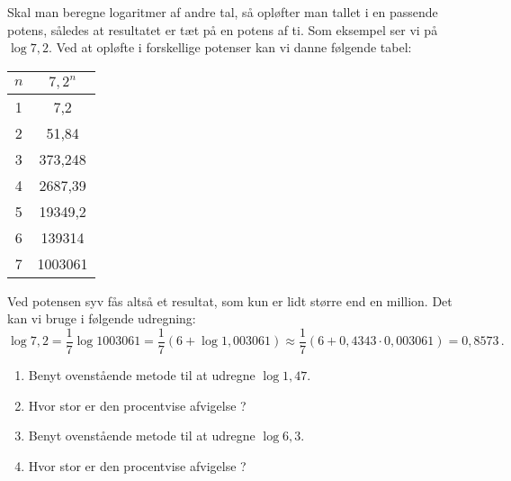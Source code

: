 \documentclass[12pt,oneside,a4paper]{article}
\theoremstyle{plain}
\begin{document}
Skal man beregne logaritmer af andre tal, så opløfter man tallet i en passende
potens, således at resultatet er tæt på en potens af ti. Som eksempel ser vi på
$\log 7,2$. Ved at opløfte i forskellige potenser kan vi danne følgende tabel:

\begin{tabular}{|c|c|}
    \hline
    $n$ & $7,2^n$ \\
    \hline
    1 & 7,2 \\
    \hline
    2 & 51,84 \\
    \hline
    3 & 373,248 \\
    \hline
    4 & 2687,39 \\
    \hline
    5 & 19349,2 \\
    \hline
    6 & 139314 \\
    \hline
    7 & 1003061 \\
    \hline
\end{tabular}

Ved potensen syv fås altså et resultat, som kun er lidt større end en million.
Det kan vi bruge i følgende udregning:
\[
    \log 7,2 = \frac17 \log 1003061 = \frac17(6+\log1,003061)
    \approx \frac17(6+0,4343\cdot0,003061) = 0,8573 \,.
\]

\begin{enumerate}[label=(\alph*), resume]
    \item Benyt ovenstående metode til at udregne $\log 1,47$.
    \item Hvor stor er den procentvise afvigelse ?
    \item Benyt ovenstående metode til at udregne $\log 6,3$.
    \item Hvor stor er den procentvise afvigelse ?
\end{enumerate}
\end{document}
